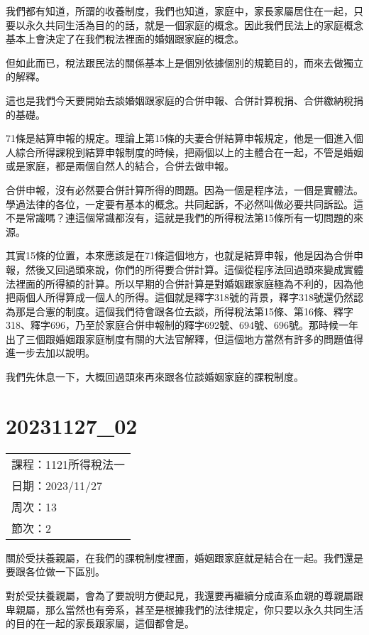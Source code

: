 \documentclass[]{ctexbook}
\begin{document}
我們都有知道，所謂的收養制度，我們也知道，家庭中，家長家屬居住在一起，只要以永久共同生活為目的的話，就是一個家庭的概念。因此我們民法上的家庭概念基本上會決定了在我們稅法裡面的婚姻跟家庭的概念。

但如此而已，稅法跟民法的關係基本上是個別依據個別的規範目的，而來去做獨立的解釋。

這也是我們今天要開始去談婚姻跟家庭的合併申報、合併計算稅捐、合併繳納稅捐的基礎。

71條是結算申報的規定。理論上第15條的夫妻合併結算申報規定，他是一個進入個人綜合所得課稅到結算申報制度的時候，把兩個以上的主體合在一起，不管是婚姻或是家庭，都是兩個自然人的結合，合併去做申報。

合併申報，沒有必然要合併計算所得的問題。因為一個是程序法，一個是實體法。學過法律的各位，一定要有基本的概念。共同起訴，不必然叫做必要共同訴訟。這不是常識嗎？連這個常識都沒有，這就是我們的所得稅法第15條所有一切問題的來源。

其實15條的位置，本來應該是在71條這個地方，也就是結算申報，他是因為合併申報，然後又回過頭來說，你們的所得要合併計算。這個從程序法回過頭來變成實體法裡面的所得額的計算。所以早期的合併計算是對婚姻跟家庭極為不利的，因為他把兩個人所得算成一個人的所得。這個就是釋字318號的背景，釋字318號還仍然認為那是合憲的制度。這個我們待會跟各位去談，所得稅法第15條、第16條、釋字318、釋字696，乃至於家庭合併申報制的釋字692號、694號、696號。那時候一年出了三個跟婚姻跟家庭制度有關的大法官解釋，但這個地方當然有許多的問題值得進一步去加以說明。

我們先休息一下，大概回過頭來再來跟各位談婚姻家庭的課稅制度。

\hypertarget{section-24}{%
\chapter{20231127\_02}\label{section-24}}

\begin{longtable}[]{@{}l@{}}
\toprule()
\endhead
課程：1121所得稅法一 \\
日期：2023/11/27 \\
周次：13 \\
節次：2 \\
\bottomrule()
\end{longtable}

關於受扶養親屬，在我們的課稅制度裡面，婚姻跟家庭就是結合在一起。我們還是要跟各位做一下區別。

對於受扶養親屬，會為了要說明方便起見，我還要再繼續分成直系血親的尊親屬跟卑親屬，那么當然也有旁系，甚至是根據我們的法律規定，你只要以永久共同生活的目的在一起的家長跟家屬，這個都會是。
\end{document}
